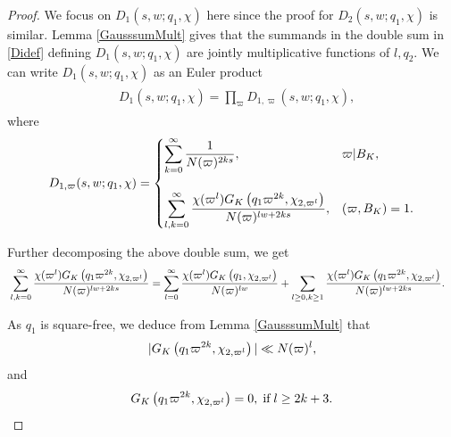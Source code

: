 \documentclass[twoside,leqno,10pt, A4]{amsart}
\begin{document}
\begin{proof}
   We focus on $D_1(s, w; q_1, \chi)$ here since the proof for $D_2(s, w; q_1, \chi)$ is similar.  Lemma \ref{GausssumMult} gives that the summands  in the double sum in \eqref{Didef} defining $D_1(s,w; q_1, \chi)$ are jointly multiplicative functions of $l,q_2$.  We can write $D_1(s,w; q_1, \chi)$ as an Euler product
\begin{align}
\label{D1Eulerprod}
\begin{split}	
 &	D_1(s, w; q_1, \chi)= \prod_{\varpi} D_{1,\varpi}(s, w; q_1,  \chi),
\end{split}
\end{align}
  where
\begin{align} \label{Dexp}
D_{1,\varpi}(s, w; q_1,  \chi)= \displaystyle
\begin{cases}
\displaystyle \sum_{k=0}^\infty\frac{ 1}{N(\varpi)^{2ks}}, & \varpi |B_K, \\ \\
\displaystyle \sum_{l,k=0}^\infty\frac{ \chi(\varpi^{l})G_K\left( q_1\varpi^{2k}, \chi_{2, \varpi^l}\right)  }{N(\varpi)^{lw+2ks}}, & (\varpi, B_K)=1.
\end{cases}
\end{align}

Further decomposing the above double sum, we get
\begin{align} \label{Dgenest}	
\begin{split}
  &	\sum_{l,k=0}^\infty\frac{ \chi(\varpi^{l})G_K\left( q_1\varpi^{2k}, \chi_{2, \varpi^l}\right)  }{N(\varpi)^{lw+2ks}}  = \sum_{l=0}^\infty \frac{
\chi(\varpi^{l}) G_K\left( q_1, \chi_{2, \varpi^l}\right)  }{N(\varpi)^{lw}}  + \sum_{l \geq 0, k \geq 1}\frac{ \chi(\varpi^{l})G_K\left(
q_1\varpi^{2k}, \chi_{2, \varpi^l}\right)  }{N(\varpi)^{lw+2ks}}.
\end{split}
\end{align}

As $q_1$ is square-free, we deduce from Lemma \ref{GausssumMult} that
\[	|G_K\left( q_1\varpi^{2k}, \chi_{2, \varpi^l} \right)| \ll N(\varpi)^l, \]
and
\[ G_K\left( q_1\varpi^{2k}, \chi_{2, \varpi^l}\right)=0, \; \mbox{if} \; l \geq 2k+3. \]


\end{proof}
\end{document}
